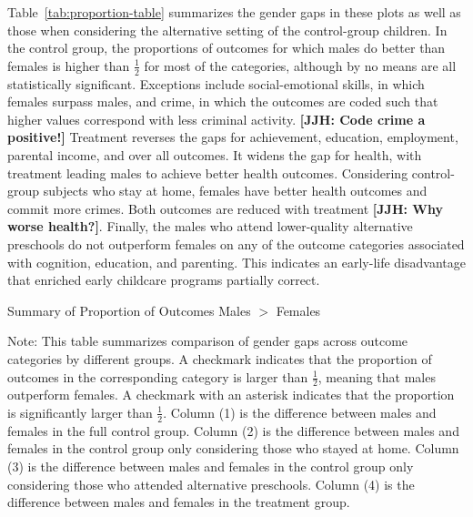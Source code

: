 Table~\ref{tab:proportion-table} summarizes the gender gaps in these plots as well as those when considering the alternative setting of the control-group children. In the control group, the proportions of outcomes for which males do better than females is higher than $\frac{1}{2}$ for most of the categories, although by no means are all statistically significant. Exceptions include social-emotional skills, in which females surpass males, and crime, in which the outcomes are coded such that higher values correspond with less criminal activity. \textbf{[JJH: Code crime a positive!]} Treatment reverses the gaps for achievement, education, employment, parental income, and over all outcomes. It widens the gap for health, with treatment leading males to achieve better health outcomes. Considering control-group subjects who stay at home, females have better health outcomes and commit more crimes. Both outcomes are reduced with treatment \textbf{[JJH: Why worse health?]}. Finally, the males who attend lower-quality alternative preschools do not outperform females on any of the outcome categories associated with cognition, education, and parenting. This indicates an early-life disadvantage that enriched early childcare programs partially correct.

\begin{table}[H]
\centering
\caption{Summary of Proportion of Outcomes Males $>$ Females}
\label{tab:proportion-table}
\begin{threeparttable}

\begin{tablenotes}
\footnotesize
\item Note: This table summarizes comparison of gender gaps across outcome categories by different groups. A checkmark indicates that the proportion of outcomes in the corresponding category is larger than $\frac{1}{2}$, meaning that males outperform females. A checkmark with an asterisk indicates that the proportion is significantly larger than $\frac{1}{2}$. Column (1) is the difference between males and females in the full control group.  Column (2) is the difference between males and females in the control group only considering those who stayed at home. Column (3) is the difference between males and females in the control group only considering those who attended alternative preschools. Column (4) is the difference between males and females in the treatment group.
\end{tablenotes}
\end{threeparttable}
\end{table}

